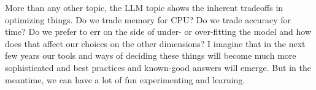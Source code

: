 More than any other topic, the LLM topic shows the inherent tradeoffs in optimizing things. Do we trade memory for CPU? Do we trade accuracy for time? Do we prefer to err on the side of under- or over-fitting the model and how does that affect our choices on the other dimensions? I imagine that in the next few years our tools and ways of deciding these things will become much more sophisticated and best practices and known-good answers will emerge. But in the meantime, we can have a lot of fun experimenting and learning.






